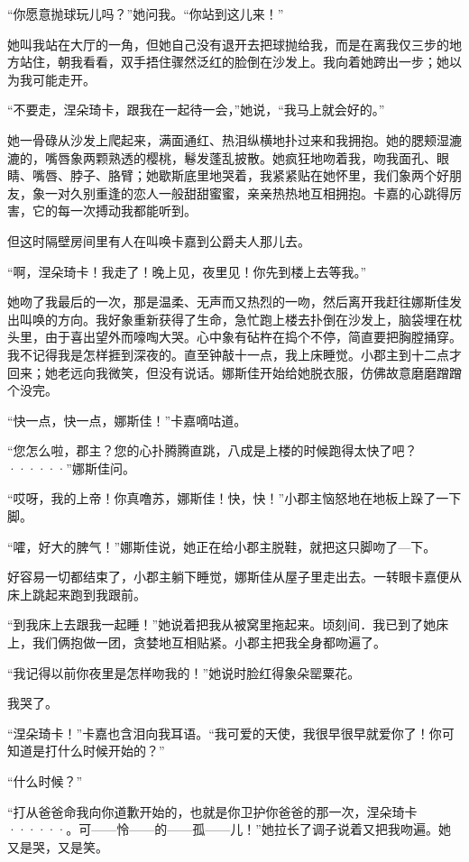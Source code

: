 \documentclass[12pt, UTF8]{ctexbook}
\begin{document}
\par “你愿意抛球玩儿吗？”她问我。“你站到这儿来！”
\par 她叫我站在大厅的一角，但她自己没有退开去把球抛给我，而是在离我仅三步的地方站住，朝我看看，双手捂住骤然泛红的脸倒在沙发上。我向着她跨出一步；她以为我可能走开。
\par “不要走，涅朵琦卡，跟我在一起待一会，”她说，“我马上就会好的。”
\par 她一骨碌从沙发上爬起来，满面通红、热泪纵横地扑过来和我拥抱。她的腮颊湿漉漉的，嘴唇象两颗熟透的樱桃，鬈发蓬乱披散。她疯狂地吻着我，吻我面孔、眼睛、嘴唇、脖子、胳臂；她歇斯底里地哭着，我紧紧贴在她怀里，我们象两个好朋友，象一对久别重逢的恋人一般甜甜蜜蜜，亲亲热热地互相拥抱。卡嘉的心跳得厉害，它的每一次搏动我都能听到。
\par 但这时隔壁房间里有人在叫唤卡嘉到公爵夫人那儿去。
\par “啊，涅朵琦卡！我走了！晚上见，夜里见！你先到楼上去等我。”
\par 她吻了我最后的一次，那是温柔、无声而又热烈的一吻，然后离开我赶往娜斯佳发出叫唤的方向。我好象重新获得了生命，急忙跑上楼去扑倒在沙发上，脑袋埋在枕头里，由于喜出望外而嚎啕大哭。心中象有砧杵在捣个不停，简直要把胸膛捅穿。我不记得我是怎样捱到深夜的。直至钟敲十一点，我上床睡觉。小郡主到十二点才回来；她老远向我微笑，但没有说话。娜斯佳开始给她脱衣服，仿佛故意磨磨蹭蹭个没完。
\par “快一点，快一点，娜斯佳！”卡嘉嘀咕道。
\par “您怎么啦，郡主？您的心扑腾腾直跳，八成是上楼的时候跑得太快了吧？······”娜斯佳问。
\par “哎呀，我的上帝！你真噜苏，娜斯佳！快，快！”小郡主恼怒地在地板上跺了一下脚。
\par “嚯，好大的脾气！”娜斯佳说，她正在给小郡主脱鞋，就把这只脚吻了—下。
\par 好容易一切都结束了，小郡主躺下睡觉，娜斯佳从屋子里走出去。一转眼卡嘉便从床上跳起来跑到我跟前。
\par “到我床上去跟我一起睡！”她说着把我从被窝里拖起来。顷刻间．我已到了她床上，我们俩抱做一团，贪婪地互相贴紧。小郡主把我全身都吻遍了。
\par “我记得以前你夜里是怎样吻我的！”她说时脸红得象朵罂粟花。
\par 我哭了。
\par “涅朵琦卡！”卡嘉也含泪向我耳语。“我可爱的天使，我很早很早就爱你了！你可知道是打什么时候开始的？”
\par “什么时候？”
\par “打从爸爸命我向你道歉开始的，也就是你卫护你爸爸的那一次，涅朵琦卡······。可——怜——的——孤——儿！”她拉长了调子说着又把我吻遍。她又是哭，又是笑。
\end{document}
